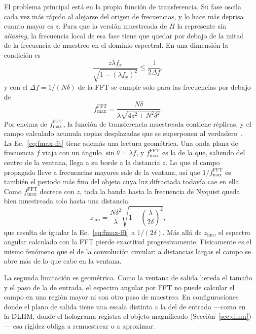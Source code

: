El problema principal está en la propia función de transferencia. Su fase
oscila cada vez más rápido al alejarse del origen de frecuencias, y lo hace
más deprisa cuanto mayor es $z$. Para que la versión muestreada de $H$ la
represente sin \emph{aliasing}, la frecuencia local de esa fase tiene que
quedar por debajo de la mitad de la frecuencia de muestreo en el dominio
espectral. En una dimensión la condición es~\cite{zhao2020}
\begin{equation}
  \frac{z\lambda f_x}{\sqrt{1 - (\lambda f_x)^2}} \le \frac{1}{2\Delta f},
  \label{eq:muestreo-h}
\end{equation}
y con el $\Delta f = 1/(N\delta)$ de la FFT se cumple solo para las
frecuencias por debajo de
\begin{equation}
  f_\mathrm{max}^\mathrm{FFT} = \frac{N\delta}{\lambda\sqrt{4z^2 + N^2\delta^2}}.
  \label{eq:fmax-fft}
\end{equation}
Por encima de $f_\mathrm{max}^\mathrm{FFT}$, la función de transferencia
muestreada contiene réplicas, y el campo calculado acumula copias desplazadas
que se superponen al verdadero~\cite{li2007, voelz2009}. La
Ec.~\eqref{eq:fmax-fft} tiene además una lectura geométrica. Una onda plana
de frecuencia $f$ viaja con un ángulo $\sin\theta = \lambda f$, y
$f_\mathrm{max}^\mathrm{FFT}$ es la de la que, saliendo del centro de la
ventana, llega a su borde a la distancia $z$. Lo que el campo propagado lleve
a frecuencias mayores sale de la ventana, así que
$1/f_\mathrm{max}^\mathrm{FFT}$ es también el periodo más fino del objeto
cuya luz difractada todavía cae en ella. Como
$f_\mathrm{max}^\mathrm{FFT}$ decrece con $z$, toda la banda hasta la
frecuencia de Nyquist queda bien muestreada solo hasta una distancia
\begin{equation}
  z_\mathrm{lim} = \frac{N\delta^2}{\lambda}\sqrt{1 - \left(\frac{\lambda}{2\delta}\right)^2},
  \label{eq:zlim}
\end{equation}
que resulta de igualar la Ec.~\eqref{eq:fmax-fft} a $1/(2\delta)$. Más allá de
$z_\mathrm{lim}$, el espectro angular calculado con la FFT pierde exactitud
progresivamente. Físicamente es el mismo fenómeno que el de la convolución
circular: a distancias largas el campo se abre más de lo que cabe en la
ventana.

La segunda limitación es geométrica. Como la ventana de salida hereda el
tamaño y el paso de la de entrada, el espectro angular por FFT no puede
calcular el campo en una región mayor ni con otro paso de muestreo. En
configuraciones donde el plano de salida tiene una escala distinta a la del de
entrada ---como en la DLHM, donde el holograma registra el objeto magnificado
(Sección~\ref{sec:dlhm})--- esa rigidez obliga a remuestrear o a aproximar.

